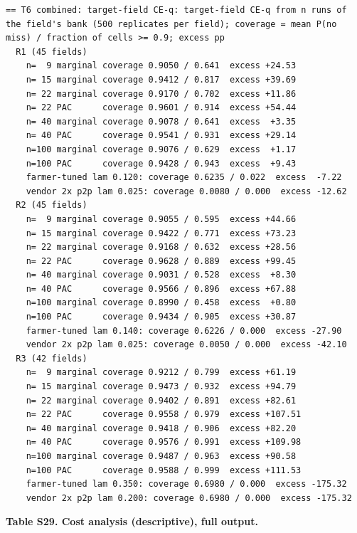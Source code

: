 \documentclass[preprint,12pt,authoryear]{elsarticle}
\begin{document}
\begin{Verbatim}[fontsize=\tiny,breaklines]
== T6 combined: target-field CE-q: target-field CE-q from n runs of the field's bank (500 replicates per field); coverage = mean P(no miss) / fraction of cells >= 0.9; excess pp
  R1 (45 fields)
    n=  9 marginal coverage 0.9050 / 0.641  excess +24.53
    n= 15 marginal coverage 0.9412 / 0.817  excess +39.69
    n= 22 marginal coverage 0.9170 / 0.702  excess +11.86
    n= 22 PAC      coverage 0.9601 / 0.914  excess +54.44
    n= 40 marginal coverage 0.9078 / 0.641  excess  +3.35
    n= 40 PAC      coverage 0.9541 / 0.931  excess +29.14
    n=100 marginal coverage 0.9076 / 0.629  excess  +1.17
    n=100 PAC      coverage 0.9428 / 0.943  excess  +9.43
    farmer-tuned lam 0.120: coverage 0.6235 / 0.022  excess  -7.22
    vendor 2x p2p lam 0.025: coverage 0.0080 / 0.000  excess -12.62
  R2 (45 fields)
    n=  9 marginal coverage 0.9055 / 0.595  excess +44.66
    n= 15 marginal coverage 0.9422 / 0.771  excess +73.23
    n= 22 marginal coverage 0.9168 / 0.632  excess +28.56
    n= 22 PAC      coverage 0.9628 / 0.889  excess +99.45
    n= 40 marginal coverage 0.9031 / 0.528  excess  +8.30
    n= 40 PAC      coverage 0.9566 / 0.896  excess +67.88
    n=100 marginal coverage 0.8990 / 0.458  excess  +0.80
    n=100 PAC      coverage 0.9434 / 0.905  excess +30.87
    farmer-tuned lam 0.140: coverage 0.6226 / 0.000  excess -27.90
    vendor 2x p2p lam 0.025: coverage 0.0050 / 0.000  excess -42.10
  R3 (42 fields)
    n=  9 marginal coverage 0.9212 / 0.799  excess +61.19
    n= 15 marginal coverage 0.9473 / 0.932  excess +94.79
    n= 22 marginal coverage 0.9402 / 0.891  excess +82.61
    n= 22 PAC      coverage 0.9558 / 0.979  excess +107.51
    n= 40 marginal coverage 0.9418 / 0.906  excess +82.20
    n= 40 PAC      coverage 0.9576 / 0.991  excess +109.98
    n=100 marginal coverage 0.9487 / 0.963  excess +90.58
    n=100 PAC      coverage 0.9588 / 0.999  excess +111.53
    farmer-tuned lam 0.350: coverage 0.6980 / 0.000  excess -175.32
    vendor 2x p2p lam 0.200: coverage 0.6980 / 0.000  excess -175.32
\end{Verbatim}

\textbf{Table S29. Cost analysis (descriptive), full output.}
\end{document}
